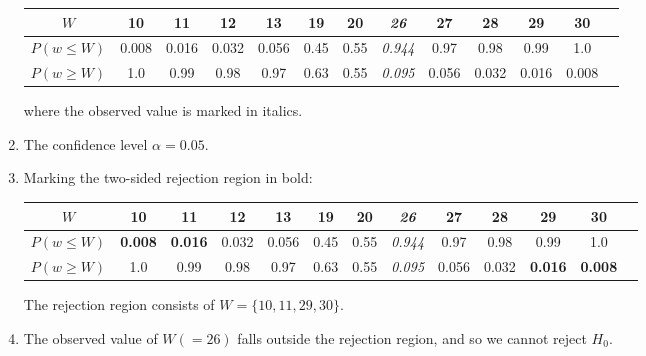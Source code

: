 \begin{enumerate}
  \begin{center}
    \begin{tabular}{c|c@{\gap}c@{\gap}c@{\gap}c@{\gap}c@{\gap}c@{\gap}c@{\gap}c@{\gap}c@{\gap}c@{\gap}c@{\gap}c}
      $W$ & 10 & 11 & 12 & 13 & 19 & 20 & \textit{26} & 27 & 28 & 29 & 30 \\ \hline
      $P(w\leq{W})$ & 0.008 & 0.016 & 0.032 & 0.056 & 0.45 & 0.55 & \textit{0.944} & 0.97 & 0.98 & 0.99 & 1.0 \\
      $P(w\geq{W})$ & 1.0 & 0.99 & 0.98 & 0.97 & 0.63 & 0.55 & \textit{0.095} & 0.056 & 0.032 & 0.016 & 0.008
    \end{tabular}
  \end{center}

  \noindent where the observed value is marked in italics.
  
\item The confidence level $\alpha = 0.05$.

\item Marking the two-sided rejection region in bold:
  
  \begin{center}
    \begin{tabular}{c|c@{\gap}c@{\gap}c@{\gap}c@{\gap}c@{\gap}c@{\gap}c@{\gap}c@{\gap}c@{\gap}c@{\gap}c@{\gap}c}
      $W$ & \textbf{10} & \textbf{11} & 12 & 13 & 19 & 20 & \textit{26} & 27 & 28 & \textbf{29} & \textbf{30} \\ \hline
      $P(w\leq{W})$ & \textbf{0.008} & \textbf{0.016} & 0.032 & 0.056 & 0.45 & 0.55 & \textit{0.944} & 0.97 & 0.98 & 0.99 & 1.0 \\
      $P(w\geq{W})$ & 1.0 & 0.99 & 0.98 & 0.97 & 0.63 & 0.55 & \textit{0.095} & 0.056 & 0.032 & \textbf{0.016} & \textbf{0.008}
    \end{tabular}
  \end{center}

  The rejection region consists of $W=\{10,11,29,30\}$.

\item The observed value of $W (=26)$ falls outside the rejection
  region, and so we cannot reject $H_0$.

\end{enumerate}


